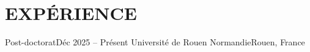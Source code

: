 \section{EXPÉRIENCE}
\resumeSubHeadingListStart

  \resumeSubheading
    {Post-doctorat}{Déc 2025 -- Présent}
    {Université de Rouen Normandie}{Rouen, France}
  \resumeItemListStart
  \resumeItemListEnd

\resumeSubHeadingListEnd
